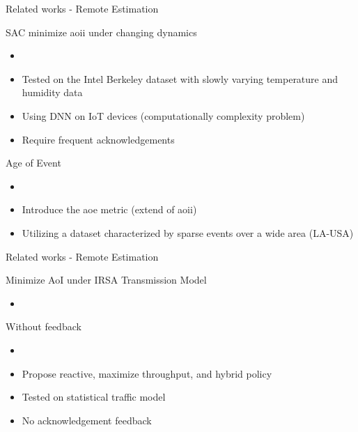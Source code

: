 \documentclass[9pt]{beamer}
\begin{document}
\begin{frame}{Related works - Remote Estimation}
    \begin{block}{SAC minimize \gls{aoii} under changing dynamics}
        \begin{itemize}
            \item {}
            \item Tested on the Intel Berkeley dataset with \alert{slowly varying} temperature and humidity data
            \item Using DNN on IoT devices (\alert{computationally complexity problem})
            \item Require \alert{frequent acknowledgements}
        \end{itemize}
    \end{block}
    \begin{block}{Age of Event}
        \begin{itemize}
            \item {}
            \item Introduce the \gls{aoe} metric (extend of \gls{aoii})
            \item Utilizing a dataset characterized by \alert{sparse events} over a \alert{wide area} (LA-USA)
        \end{itemize}
    \end{block}
\end{frame}

\begin{frame}{Related works - Remote Estimation}
    \begin{block}{Minimize AoI under IRSA Transmission Model}
        \begin{itemize}
            \item {}
        \end{itemize}
    \end{block}
    \begin{block}{Without feedback}
        \begin{itemize}
            \item {}
            \item Propose \alert{reactive}, \alert{maximize throughput}, and \alert{hybrid} policy
            \item Tested on \alert{statistical traffic model}
            \item \alert{No acknowledgement} feedback
        \end{itemize}
    \end{block}
\end{frame}
\end{document}
